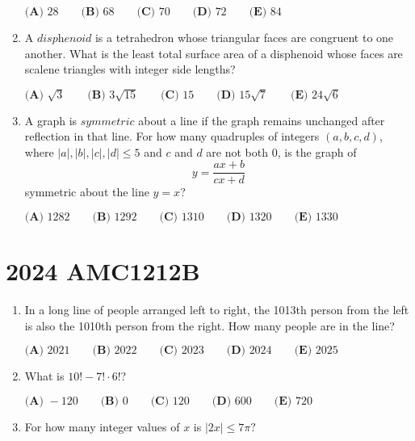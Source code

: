 \documentclass{article}
\begin{document}
\begin{enumerate}[label=\arabic*., itemsep=0.5em]
$\textbf{(A) } 28 \qquad \textbf{(B) } 68 \qquad \textbf{(C) } 70 \qquad \textbf{(D) } 72 \qquad \textbf{(E) } 84$\par \vspace{0.5em}\item A $\textit{disphenoid}$ is a tetrahedron whose triangular faces are congruent to one another. What is the least total surface area of a disphenoid whose faces are scalene triangles with integer side lengths?

$\textbf{(A) }\sqrt{3}\qquad\textbf{(B) }3\sqrt{15}\qquad\textbf{(C) }15\qquad\textbf{(D) }15\sqrt{7}\qquad\textbf{(E) }24\sqrt{6}$\par \vspace{0.5em}\item A graph is $\textit{symmetric}$ about a line if the graph remains unchanged after reflection in that line. For how many quadruples of integers $(a,b,c,d)$, where $|a|,|b|,|c|,|d|\le5$ and $c$ and $d$ are not both $0$, is the graph of 
\begin{equation*}
y=\frac{ax+b}{cx+d}
\end{equation*}
symmetric about the line $y=x$?

$\textbf{(A) }1282\qquad\textbf{(B) }1292\qquad\textbf{(C) }1310\qquad\textbf{(D) }1320\qquad\textbf{(E) }1330$\par \vspace{0.5em}\end{enumerate}\newpage\section*{2024 AMC1212B}\begin{enumerate}[label=\arabic*., itemsep=0.5em]\item In a long line of people arranged left to right, the 1013th person from the left is also the 1010th person from the right. How many people are in the line?

$\textbf{(A) } 2021 \qquad\textbf{(B) } 2022 \qquad\textbf{(C) } 2023 \qquad\textbf{(D) } 2024 \qquad\textbf{(E) } 2025$\par \vspace{0.5em}\item What is $10! - 7! \cdot 6!$?

$\textbf{(A) }-120 \qquad\textbf{(B) }0 \qquad\textbf{(C) }120 \qquad\textbf{(D) }600 \qquad\textbf{(E) }720 \qquad$\par \vspace{0.5em}\item For how many integer values of $x$ is $|2x|\leq 7\pi?$


\end{enumerate}
\end{document}
